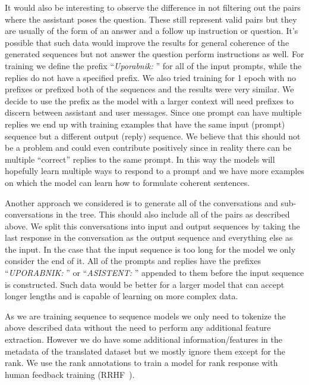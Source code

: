 \documentclass[fleqn,moreauthors,10pt]{ds_report}
\begin{document}
    It would also be interesting to observe the difference in not filtering out the pairs where the assistant poses the question.
    These still represent valid pairs but they are usually of the form of an answer and a follow up instruction or question.
    It's possible that such data would improve the results for general coherence of the generated sequences but not answer the question perform instructions as well.
    For training we define the prefix ``\textit{Uporabnik: }'' for all of the input prompts, while the replies do not have a specified prefix.
    We also tried training for 1 epoch with no prefixes or prefixed both of the sequences and the results were very similar. We decide to use the prefix as the model with a larger context will need prefixes to discern between assistant and user messages.
    Since one prompt can have multiple replies we end up with training examples that have the same input (prompt) sequence but a different output (reply) sequence.
    We believe that this should not be a problem and could even contribute positively since in reality there can be multiple ``correct'' replies to the same prompt.
    In this way the models will hopefully learn multiple ways to respond to a prompt and we have more examples on which the model can learn how to formulate coherent sentences.

    
    Another approach we considered is to generate all of the conversations and sub-conversations in the tree.
    This should also include all of the pairs as described above.
    We split this conversations into input and output sequences by taking the last response in the conversation as the output sequence and everything else as the input.
    In the case that the input sequence is too long for the model we only consider the end of it.
    All of the prompts and replies have the prefixes ``\textit{UPORABNIK: }'' or ``\textit{ASISTENT: }'' appended to them before the input sequence is constructed.
    Such data would be better for a larger model that can accept longer lengths and is capable of learning on more complex data.

    As we are training sequence to sequence models we only need to tokenize the above described data without the need to perform any additional feature extraction.
    However we do have some additional information/features in the metadata of the translated dataset but we mostly ignore them except for the rank. We use the rank annotations to train a model for rank response with human feedback training (RRHF~\cite{yuan2023rrhf}).
\end{document}
